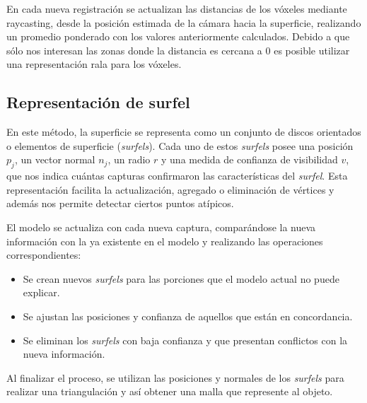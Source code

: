 En cada nueva registración se actualizan las distancias de los vóxeles mediante raycasting,
desde la posición estimada de la cámara hacia la superficie,
realizando un promedio ponderado con los valores anteriormente calculados.\cite{Curless:1996:VMB:237170.237269} %
Debido a que sólo nos interesan las zonas donde la distancia es cercana a 0
es posible utilizar una representación rala para los vóxeles.\cite{Steinbrucker:2013:LMS:2586117.2586926} %


\subsection{Representación de surfel}
En este método, la superficie se representa como un conjunto de discos orientados o elementos de superficie (\emph{surfels}).
Cada uno de estos \emph{surfels} posee una posición $p_j$,
un vector normal $n_j$, un radio $r$ y una medida de confianza de visibilidad $v$,
que nos indica cuántas capturas confirmaron las características del \emph{surfel}.
Esta representación facilita la actualización, agregado o eliminación de vértices y además nos permite detectar ciertos puntos atípicos\cite{5457479}.

El modelo se actualiza con cada nueva captura, comparándose la nueva información
con la ya existente en el modelo y realizando las operaciones correspondientes:
\begin{itemize}
	\item Se crean nuevos \emph{surfels} para las porciones que el modelo actual no puede explicar.
	\item Se ajustan las posiciones y confianza de aquellos que están en concordancia.
	\item Se eliminan los \emph{surfels} con baja confianza y que presentan conflictos con la nueva información.
\end{itemize}

Al finalizar el proceso, se utilizan las posiciones y normales de los \emph{surfels} para realizar una
triangulación y así obtener una malla que represente al objeto.

